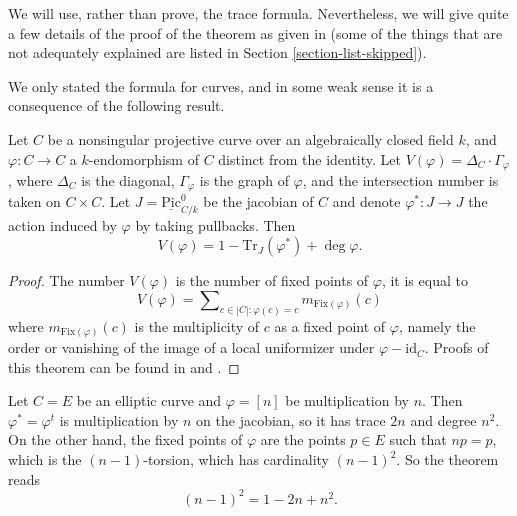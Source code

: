\noindent
We will use, rather than prove, the trace formula. Nevertheless, we will
give quite a few details of the proof of the theorem as given in
\cite{SGA4.5} (some of the things that are not adequately explained
are listed in Section \ref{section-list-skipped}).

\medskip\noindent
We only stated the formula for curves, and in some weak
sense it is a consequence of the following result.

\begin{theorem}[Weil]
\label{theorem-weil-trace-formula}
Let $C$ be a nonsingular projective curve over an algebraically closed field
$k$, and $\varphi : C \to C$ a $k$-endomorphism of $C$ distinct from the
identity. Let $V(\varphi) = \Delta_C \cdot \Gamma_\varphi$, where $\Delta_C$ is
the diagonal, $\Gamma_\varphi$ is the graph of $\varphi$, and the intersection
number is taken on $C \times C$. Let $J = \underline{\text{Pic}}^0_{C/k}$ be the
jacobian of $C$ and denote $\varphi^* : J \to J$ the action induced by
$\varphi$ by taking pullbacks. Then
$$
V(\varphi) = 1 - \text{Tr}_J(\varphi^*) + \deg \varphi.
$$
\end{theorem}

\begin{proof}
The number $V(\varphi)$ is the number of fixed points of $\varphi$, it is equal
to
$$
V(\varphi) =
\sum\nolimits_{c \in |C| : \varphi(c) = c} m_{\text{Fix}(\varphi)} (c)
$$
where $m_{\text{Fix}(\varphi)} (c)$ is the multiplicity of $c$ as a fixed point
of $\varphi$, namely the order or vanishing of the image of a local uniformizer
under $\varphi - \text{id}_C$. Proofs of this theorem can be found in
\cite{Lang} and \cite{Weil}.
\end{proof}

\begin{example}
\label{example-elliptic-curve}
Let $C = E$ be an elliptic curve and $\varphi = [n]$ be multiplication by $n$.
Then $\varphi^* = \varphi^t$ is multiplication by $n$ on the jacobian, so it
has trace $2n$ and degree $n^2$. On the other hand, the fixed points of
$\varphi$ are the points $p \in E$ such that $n p = p$, which is the
$(n-1)$-torsion, which has cardinality $(n-1)^2$. So the theorem reads
$$
(n-1)^2 = 1 - 2n + n^2.
$$
\end{example}

